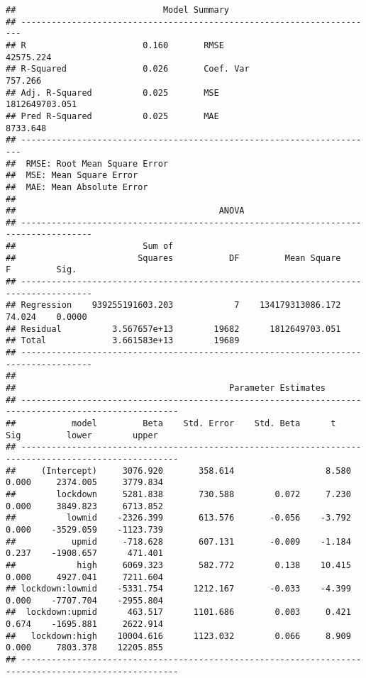 \documentclass[]{article}
\begin{document}
\begin{verbatim}
##                             Model Summary                              
## ----------------------------------------------------------------------
## R                       0.160       RMSE                    42575.224 
## R-Squared               0.026       Coef. Var                 757.266 
## Adj. R-Squared          0.025       MSE                1812649703.051 
## Pred R-Squared          0.025       MAE                      8733.648 
## ----------------------------------------------------------------------
##  RMSE: Root Mean Square Error 
##  MSE: Mean Square Error 
##  MAE: Mean Absolute Error 
## 
##                                        ANOVA                                         
## ------------------------------------------------------------------------------------
##                         Sum of                                                      
##                        Squares           DF         Mean Square      F         Sig. 
## ------------------------------------------------------------------------------------
## Regression    939255191603.203            7    134179313086.172    74.024    0.0000 
## Residual          3.567657e+13        19682      1812649703.051                     
## Total             3.661583e+13        19689                                         
## ------------------------------------------------------------------------------------
## 
##                                          Parameter Estimates                                          
## -----------------------------------------------------------------------------------------------------
##           model         Beta    Std. Error    Std. Beta      t        Sig         lower        upper 
## -----------------------------------------------------------------------------------------------------
##     (Intercept)     3076.920       358.614                  8.580    0.000     2374.005     3779.834 
##        lockdown     5281.838       730.588        0.072     7.230    0.000     3849.823     6713.852 
##          lowmid    -2326.399       613.576       -0.056    -3.792    0.000    -3529.059    -1123.739 
##           upmid     -718.628       607.131       -0.009    -1.184    0.237    -1908.657      471.401 
##            high     6069.323       582.772        0.138    10.415    0.000     4927.041     7211.604 
## lockdown:lowmid    -5331.754      1212.167       -0.033    -4.399    0.000    -7707.704    -2955.804 
##  lockdown:upmid      463.517      1101.686        0.003     0.421    0.674    -1695.881     2622.914 
##   lockdown:high    10004.616      1123.032        0.066     8.909    0.000     7803.378    12205.855 
## -----------------------------------------------------------------------------------------------------
\end{verbatim}
\end{document}
